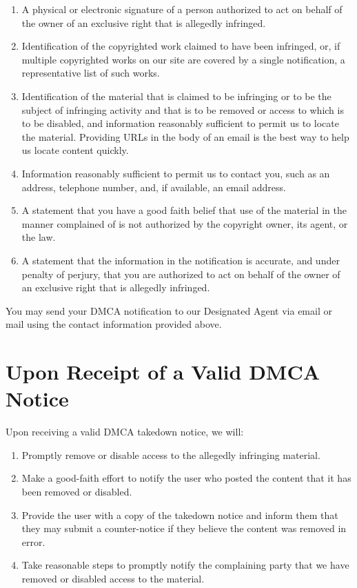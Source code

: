 \documentclass[11pt]{article}
\begin{document}
\begin{enumerate}
  \item A physical or electronic signature of a person authorized to act on behalf of the owner of an exclusive right that is allegedly infringed.
  
  \item Identification of the copyrighted work claimed to have been infringed, or, if multiple copyrighted works on our site are covered by a single notification, a representative list of such works.
  
  \item Identification of the material that is claimed to be infringing or to be the subject of infringing activity and that is to be removed or access to which is to be disabled, and information reasonably sufficient to permit us to locate the material. Providing URLs in the body of an email is the best way to help us locate content quickly.
  
  \item Information reasonably sufficient to permit us to contact you, such as an address, telephone number, and, if available, an email address.
  
  \item A statement that you have a good faith belief that use of the material in the manner complained of is not authorized by the copyright owner, its agent, or the law.
  
  \item A statement that the information in the notification is accurate, and under penalty of perjury, that you are authorized to act on behalf of the owner of an exclusive right that is allegedly infringed.
\end{enumerate}

You may send your DMCA notification to our Designated Agent via email or mail using the contact information provided above.

\section{Upon Receipt of a Valid DMCA Notice}
Upon receiving a valid DMCA takedown notice, we will:

\begin{enumerate}
  \item Promptly remove or disable access to the allegedly infringing material.
  
  \item Make a good-faith effort to notify the user who posted the content that it has been removed or disabled.
  
  \item Provide the user with a copy of the takedown notice and inform them that they may submit a counter-notice if they believe the content was removed in error.
  
  \item Take reasonable steps to promptly notify the complaining party that we have removed or disabled access to the material.
\end{enumerate}
\end{document}
